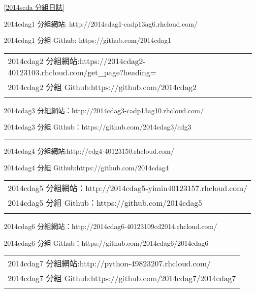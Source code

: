 \documentclass[]{article}
\begin{document}
{[}\hyperref[scda-ux5206ux7d44ux65e5ux8a8c]{2014scda 分組日誌}{]}

2014cdag1 分組網站: http://2014cdag1-cadp13ag6.rhcloud.com/

2014cdag1 分組 Github: https://github.com/2014cdag1

\begin{longtable}[c]{@{}l@{}}
\toprule\addlinespace
\begin{minipage}[t]{0.09\columnwidth}\raggedright
2014cdag2
分組網站:https://2014cdag2-40123103.rhcloud.com/get\_page?heading=
\end{minipage}
\\\addlinespace
\begin{minipage}[t]{0.09\columnwidth}\raggedright
2014cdag2 分組 Github:https://github.com/2014cdag2
\end{minipage}
\\\addlinespace
\bottomrule
\end{longtable}

2014cdag3 分組網站：http://2014cdag3-cadp13ag10.rhcloud.com/

2014cdag3 分組 Github：https://github.com/2014cdag3/cdg3

\begin{center}\rule{3in}{0.4pt}\end{center}

2014cdag4 分組網站:http://cdg4-40123150.rhcloud.com/

2014cdag4 分組 Github:https://github.com/2014cdag4

\begin{longtable}[c]{@{}l@{}}
\toprule\addlinespace
\begin{minipage}[t]{0.09\columnwidth}\raggedright
2014cdag5 分組網站：http://2014cdag5-yimin40123157.rhcloud.com/
\end{minipage}
\\\addlinespace
\begin{minipage}[t]{0.09\columnwidth}\raggedright
2014cdag5 分組 Github：https://github.com/2014cdag5
\end{minipage}
\\\addlinespace
\bottomrule
\end{longtable}

2014cdag6 分組網站：http://2014cdag6-40123109cd2014.rhcloud.com/

2014cdag6 分組 Github：https://github.com/2014cdag6/2014cdag6

\begin{longtable}[c]{@{}l@{}}
\toprule\addlinespace
\begin{minipage}[t]{0.09\columnwidth}\raggedright
2014cdag7 分組網站:http://python-49823207.rhcloud.com/
\end{minipage}
\\\addlinespace
\begin{minipage}[t]{0.09\columnwidth}\raggedright
2014cdag7 分組 Github:https://github.com/2014cdag7/2014cdag7
\end{minipage}
\\\addlinespace
\bottomrule
\end{longtable}
\end{document}
